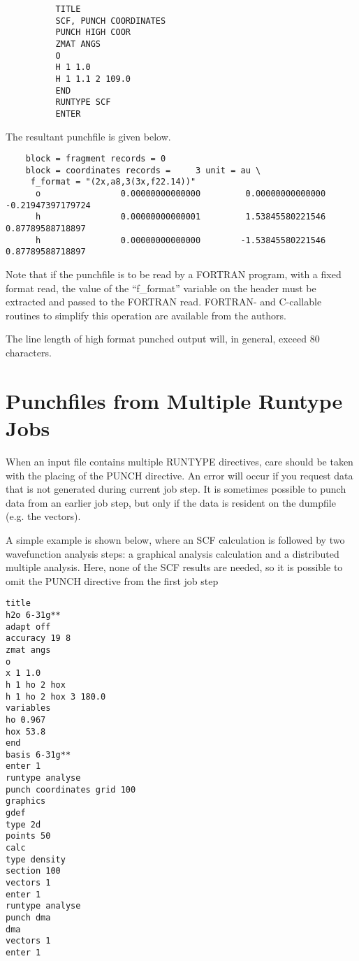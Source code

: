 \documentclass[11pt,fleqn]{article}
\begin{document}
{
\footnotesize
\begin{verbatim}
          TITLE
          SCF, PUNCH COORDINATES
          PUNCH HIGH COOR
          ZMAT ANGS
          O
          H 1 1.0
          H 1 1.1 2 109.0
          END             
          RUNTYPE SCF
          ENTER
\end{verbatim}
}
The resultant punchfile is given below.
{
\footnotesize
\begin{verbatim}
    block = fragment records = 0
    block = coordinates records =     3 unit = au \
     f_format = "(2x,a8,3(3x,f22.14))"
      o                0.00000000000000         0.00000000000000        -0.21947397179724
      h                0.00000000000001         1.53845580221546         0.87789588718897
      h                0.00000000000000        -1.53845580221546         0.87789588718897
\end{verbatim}
}
Note that if the punchfile is to be read by a FORTRAN program, with a fixed
format read, the value of the ``f\_format'' variable on the header must
be extracted and passed to the FORTRAN read. FORTRAN- and C-callable routines
to simplify this operation are available from the authors.

The line length of high format punched output will, in general, exceed 80 characters.


\section[Punchfiles from Multiple Runtype Jobs]{Punchfiles from Multiple Runtype Jobs}
\label{multrun}

When an input file contains multiple RUNTYPE directives, care should
be taken with the placing of the PUNCH directive. An error will occur
if you request data that is not generated during current job step.  It
is sometimes possible to punch data from an earlier job step, but only
if the data is resident on the dumpfile (e.g. the vectors).

A simple example is shown below, where an SCF calculation is followed
by two wavefunction analysis steps: a graphical analysis calculation
and a distributed multiple analysis. Here, none of the SCF results are
needed, so it is possible to omit the PUNCH directive from the first
job step


\begin{verbatim}
title
h2o 6-31g**
adapt off
accuracy 19 8
zmat angs
o
x 1 1.0
h 1 ho 2 hox
h 1 ho 2 hox 3 180.0
variables
ho 0.967
hox 53.8
end
basis 6-31g**
enter 1
runtype analyse
punch coordinates grid 100
graphics
gdef 
type 2d
points 50
calc
type density
section 100
vectors 1
enter 1
runtype analyse
punch dma
dma
vectors 1
enter 1
\end{verbatim}

\clearpage
\end{document}
